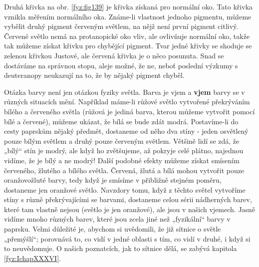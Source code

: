     Druhá křivka na obr. \ref{fyz:fig139} je křivka získaná pro normální oko. Tato křivka vznikla 
    měřením normálního oka. Známe-li vlastnost jednoho pigmentu, můžeme vybělit druhý pigment 
    červeným světlem, na nějž není první pigment citlivý. Červené světlo nemá na protanopické oko 
    vliv, ale ovlivňuje normální oko, takže tak můžeme získat křivku pro chybějící pigment. Tvar 
    jedné křivky se shoduje se zelenou křivkou Justové, ale červená křivka je o něco posunuta. Snad 
    se dostáváme na správnou stopu, aleje možné, že ne, neboť poslední výzkumy s deuteranopy 
    neukazují na to, že by nějaký pigment chyběl.
    
    Otázka barvy není jen otázkou fyziky světla. Barva je vjem a \textbf{vjem} barvy se v různých 
    situacích mění. Například máme-li růžové světlo vytvořené překrýváním bílého a červeného světla 
    (růžová je jediná barva, kterou můžeme vytvořit pomocí bílé a červené), můžeme ukázat, že bílá 
    se bude zdát modrá. Postavíme-li do cesty paprskům nějaký předmět, dostaneme od něho dva stíny 
    - jeden osvětlený pouze bílým světlem a druhý pouze červeným světlem. Většině lidí se zdá, že 
    „bílý“ stín je modrý, ale když ho zvětšujeme, až pokryje celé plátno, najednou vidíme, že je 
    bílý a ne modrý! Další podobné efekty můžeme získat smísením červeného, žlutého a bílého 
    světla. Červená, žlutá a bílá mohou vytvořit pouze oranžovožluté barvy, tedy když je smísíme v 
    přibližně stejném poměru, dostaneme jen oranžové světlo. Navzdory tomu, když z těchto světel 
    vytvoříme stíny s různě překrývajícími se barvami, dostaneme celou sérii nádherných barev, 
    které tam vlastně nejsou (světlo je jen oranžové), ale jsou v našich vjemech. Jasně vidíme 
    mnoho různých barev, které jsou zcela jiné než „fyzikální“ barvy v paprsku. Velmi důležité je, 
    abychom si uvědomili, že již sítnice o světle „přemýšlí“; porovnává to, co vidí v jedné oblasti 
    s tím, co vidí v druhé, i když si to neuvědomuje. O našich poznatcích, jak to sítnice dělá, se 
    zabývá kapitola \ref{fyz:IchapXXXVI}. 
    

\printbibliography[title={Seznam literatury}, heading=subbibliography]
